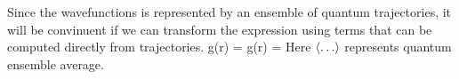 \documentclass[11pt]{revtex4}
\begin{document}
Since the wavefunctions is represented by an ensemble of quantum trajectories, it will be convinuent if we can transform the expression using terms that can be computed directly from trajectories.  
\be g(r)  = \left \bra {}  \right \ket \ee 
\be g(r) =  \left \bra {}  \right \ket \ee
Here $\bra \dots \ket$ represents quantum ensemble average.  


\end{document}
